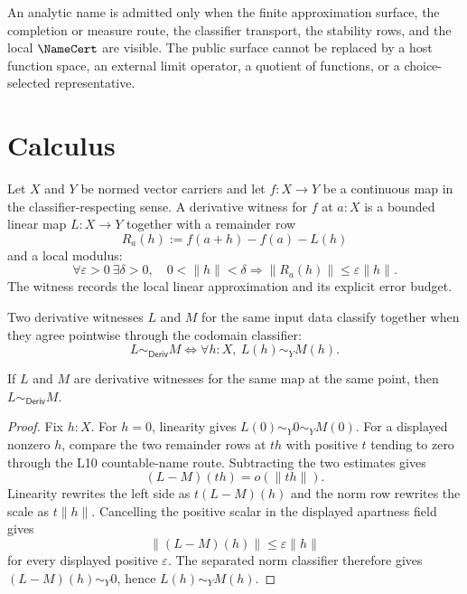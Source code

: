 \begin{principle}
\label{prin:analysis-spine-certificate-facing}
An analytic name is admitted only when the finite approximation surface, the
completion or measure route, the classifier transport, the stability rows, and
the local $\NameCert$ are visible.  The public surface cannot be replaced by a
host function space, an external limit operator, a quotient of functions, or a
choice-selected representative.
\end{principle}

\section{Calculus}
\label{sec:analysis-spine-calculus}

\begin{definition}
\label{def:analysis-spine-derivative-witness}
Let $X$ and $Y$ be normed vector carriers and let $f:X\to Y$ be a continuous
map in the classifier-respecting sense.  A derivative witness for $f$ at
$a:X$ is a bounded linear map $L:X\to Y$ together with a remainder row
$$
R_a(h):=f(a+h)-f(a)-L(h)
$$
and a local modulus:
$$
\forall \varepsilon>0\ \exists \delta>0,\quad
0<\lVert h\rVert<\delta
\Longrightarrow
\lVert R_a(h)\rVert\le \varepsilon\lVert h\rVert .
$$
The witness records the local linear approximation and its explicit error
budget.
\end{definition}

\begin{definition}
\label{def:analysis-spine-derivative-classifier}
Two derivative witnesses $L$ and $M$ for the same input data classify
together when they agree pointwise through the codomain classifier:
$$
L\sim_{\mathsf{Deriv}} M
\Longleftrightarrow
\forall h:X,\ L(h)\sim_Y M(h).
$$
\end{definition}

\begin{theorem}
\label{thm:analysis-spine-derivative-uniqueness}
If $L$ and $M$ are derivative witnesses for the same map at the same point,
then $L\sim_{\mathsf{Deriv}}M$.
\end{theorem}

\begin{proof}
Fix $h:X$.  For $h=0$, linearity gives $L(0)\sim_Y0\sim_YM(0)$.  For a
displayed nonzero $h$, compare the two remainder rows at $t h$ with
positive $t$ tending to zero through the L10 countable-name route.  Subtracting
the two estimates gives
$$
(L-M)(t h)=o(\lVert t h\rVert).
$$
Linearity rewrites the left side as $t(L-M)(h)$ and the norm row rewrites the
scale as $t\lVert h\rVert$.  Cancelling the positive scalar in the displayed
apartness field gives
$$
\lVert (L-M)(h)\rVert\le \varepsilon\lVert h\rVert
$$
for every displayed positive $\varepsilon$.  The separated norm classifier
therefore gives $(L-M)(h)\sim_Y0$, hence $L(h)\sim_YM(h)$.
\end{proof}

